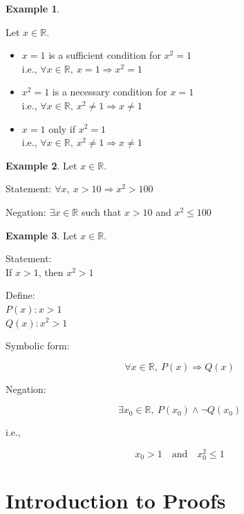 \documentclass[
]{book}
\theoremstyle{definition}
\theoremstyle{definition}
\newtheorem{example}{Example}[chapter]
\theoremstyle{definition}
\theoremstyle{definition}
\theoremstyle{remark}
\begin{document}
\begin{example}
\protect\hypertarget{exm:unnamed-chunk-54}{}\label{exm:unnamed-chunk-54}

Let \(x \in \mathbb{R}\).

\begin{itemize}
\item
  \(x = 1\) is a sufficient condition for \(x^2 = 1\)\\
  i.e., \(\forall x \in \mathbb{R},\ x = 1 \Rightarrow x^2 = 1\)
\item
  \(x^2 = 1\) is a necessary condition for \(x = 1\)\\
  i.e., \(\forall x \in \mathbb{R},\ x^2 \neq 1 \Rightarrow x \neq 1\)
\item
  \(x = 1\) only if \(x^2 = 1\)\\
  i.e., \(\forall x \in \mathbb{R},\ x^2 \neq 1 \Rightarrow x \neq 1\)
\end{itemize}

\end{example}

\begin{example}
\protect\hypertarget{exm:unnamed-chunk-55}{}\label{exm:unnamed-chunk-55}Let \(x \in \mathbb{R}\).

Statement: \(\forall x,\ x > 10 \Rightarrow x^2 > 100\)

Negation: \(\exists x \in \mathbb{R}\) such that \(x > 10\) and \(x^2 \leq 100\)
\end{example}

\begin{example}
\protect\hypertarget{exm:unnamed-chunk-56}{}\label{exm:unnamed-chunk-56}Let \(x \in \mathbb{R}\).

Statement:\\
If \(x > 1\), then \(x^2 > 1\)

Define:\\
\(P(x): x > 1\)\\
\(Q(x): x^2 > 1\)

Symbolic form:

\[
\forall x \in \mathbb{R},\ P(x) \Rightarrow Q(x)
\]

Negation:

\[
\exists x_0 \in \mathbb{R},\ P(x_0) \land \neg Q(x_0)
\]

i.e.,

\[
x_0 > 1 \quad \text{and} \quad x_0^2 \leq 1
\]
\end{example}

\chapter{Introduction to Proofs}\label{introduction-to-proofs}
\end{document}
